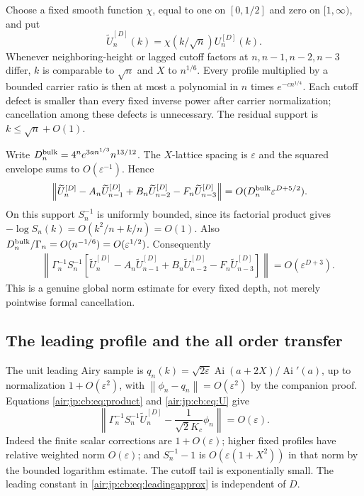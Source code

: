 \documentclass[11pt,letterpaper]{article}
\numberwithin{equation}{section}
\theoremstyle{remark}
\newcommand{\Ai}{\operatorname{Ai}}
\newcommand{\norm}[1]{\left\lVert#1\right\rVert}
\newcommand{\eps}{\varepsilon}
\begin{document}
Choose a fixed smooth function $\chi$, equal to one on $[0,1/2]$ and zero on $[1,\infty)$, and put
\[
 \widetilde U_n^{[D]}(k)=\chi(k/\sqrt n)U_n^{[D]}(k).
\]
Whenever neighboring-height or lagged cutoff factors at $n,n-1,n-2,n-3$ differ, $k$ is comparable to $\sqrt n$ and $X$ to $n^{1/6}$. Every profile multiplied by a bounded carrier ratio is then at most a polynomial in $n$ times $e^{-cn^{1/4}}$. Each cutoff defect is smaller than every fixed inverse power after carrier normalization; cancellation among these defects is unnecessary. The residual support is $k\le\sqrt n+O(1)$.

Write $D_n^{\rm bulk}=4^ne^{3an^{1/3}}n^{13/12}$. The $X$-lattice spacing is $\eps$ and the squared envelope sums to $O(\eps^{-1})$. Hence
\begin{align}
 &\norm{\widetilde U_n^{[D]}-A_n\widetilde U_{n-1}^{[D]}
                 +B_n\widetilde U_{n-2}^{[D]}-F_n\widetilde U_{n-3}^{[D]}}
 =O(D_n^{\rm bulk}\eps^{D+5/2}).\label{air:jp:cb:eq:rawresidual}
\end{align}
On this support $S_n^{-1}$ is uniformly bounded, since its factorial product gives $-\log S_n(k)=O(k^2/n+k/n)=O(1)$. Also $D_n^{\rm bulk}/\Gamma_n=O(n^{-1/6})=O(\eps^{1/2})$. Consequently
\begin{align}
 &\norm{\Gamma_n^{-1}S_n^{-1}
 \left[\widetilde U_n^{[D]}-A_n\widetilde U_{n-1}^{[D]}
                 +B_n\widetilde U_{n-2}^{[D]}-F_n\widetilde U_{n-3}^{[D]}\right]}
 =O(\eps^{D+3}).\label{air:jp:cb:eq:normalizedresidual}
\end{align}
This is a genuine global norm estimate for every fixed depth, not merely pointwise formal cancellation.

\subsection{The leading profile and the all order transfer}
The unit leading Airy sample is $q_n(k)=\sqrt{2\eps}\Ai(a+2X)/\Ai'(a)$, up to normalization $1+O(\eps^2)$, with $\norm{\phi_n-q_n}=O(\eps^2)$ by the companion proof. Equations \eqref{air:jp:cb:eq:product} and \eqref{air:jp:cb:eq:U} give
\begin{equation}\label{air:jp:cb:eq:leadingapprox}
 \norm{\Gamma_n^{-1}S_n^{-1}\widetilde U_n^{[D]}
           -\frac1{\sqrt2K_c}\phi_n}=O(\eps).
\end{equation}
Indeed the finite scalar corrections are $1+O(\eps)$; higher fixed profiles have relative weighted norm $O(\eps)$; and $S_n^{-1}-1$ is $O(\eps(1+X^2))$ in that norm by the bounded logarithm estimate. The cutoff tail is exponentially small. The leading constant in \eqref{air:jp:cb:eq:leadingapprox} is independent of $D$.
\end{document}
